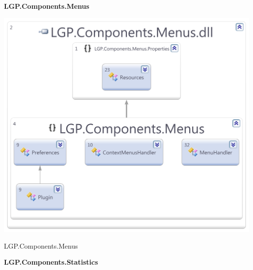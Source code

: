 	\large{\bfseries{LGP.Components.Menus}}
	\vspace{5mm}

		\begin{figurehere}
			\centering
			\includegraphics[scale=0.4]{pages/appendix3/figures/dllscreens/menus.png}
			\caption{LGP.Components.Menus}
		\end{figurehere}
		
		
\newpage
		
	
	\large{\bfseries{LGP.Components.Statistics}}
	\vspace{5mm}
	

